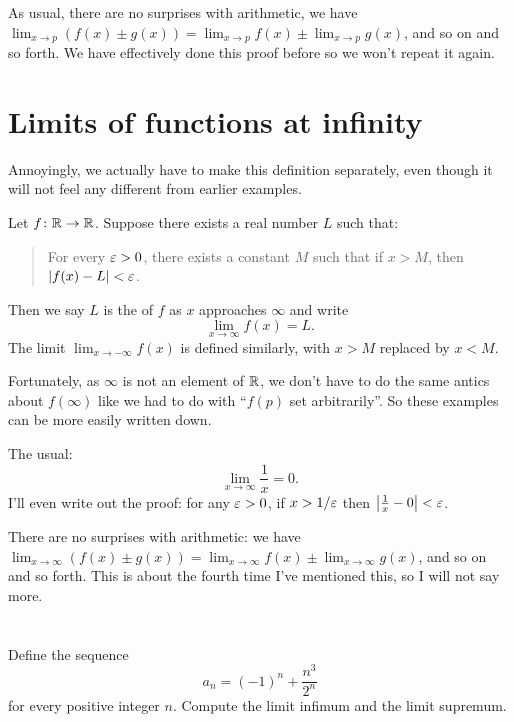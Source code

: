 As usual, there are no surprises with arithmetic,
we have $\lim_{x \to p} (f(x) \pm g(x))
	= \lim_{x \to p} f(x) \pm \lim_{x \to p} g(x)$,
and so on and so forth.
We have effectively done this proof before
so we won't repeat it again.

\section{Limits of functions at infinity}
Annoyingly, we actually have to make this
definition separately,
even though it will not feel any different
from earlier examples.
\begin{definition}
	Let $f \colon \mathbb R \to \mathbb R$.
	Suppose there exists a real number $L$ such that:
	\begin{quote}
		For every $\varepsilon > 0$, there exists a constant $M$
		such that if $x > M$, then $\left\lvert f(x)-L \right\rvert < \varepsilon$.
	\end{quote}
	Then we say $L$ is the  of $f$ as
	$x$ approaches $\infty$ and write
	\[ \lim_{x \to \infty} f(x) = L. \]
	The limit $\lim_{x \to -\infty} f(x)$ is defined similarly,
	with $x > M$ replaced by $x < M$.
\end{definition}
Fortunately, as $\infty$ is not an element of $\mathbb R$,
we don't have to do the same antics about $f(\infty)$
like we had to do with ``$f(p)$ set arbitrarily''.
So these examples can be more easily written down.
\begin{example}
	The usual:
	\[ \lim_{x \to \infty} \frac 1x = 0. \]
	I'll even write out the proof:
	for any $\varepsilon > 0$, if $x > 1/\varepsilon$
	then $\left\lvert \frac 1x - 0 \right\rvert < \varepsilon$.
\end{example}

There are no surprises with arithmetic:
we have $\lim_{x \to \infty} (f(x) \pm g(x))
	= \lim_{x \to \infty} f(x) \pm \lim_{x \to \infty} g(x)$,
and so on and so forth.
This is about the fourth time
I've mentioned this, so I will not say more.

\section{\problemhead}

\begin{problem}
	Define the sequence
	\[ a_n = (-1)^n + \frac{n^3}{2^n} \]
	for every positive integer $n$.
	Compute the limit infimum and the limit supremum.
\end{problem}

